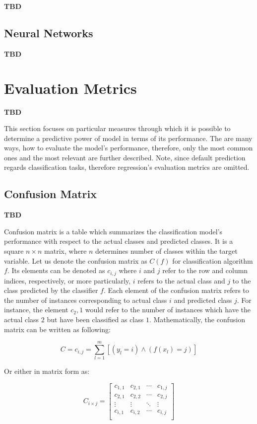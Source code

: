 \textbf{TBD}
\subsection{Neural Networks}

\textbf{TBD}

\section{Evaluation Metrics}

\textbf{TBD}

This section focuses on particular measures through which it is possible to determine a predictive power of model in terms of its performance.
The are many ways, how to evaluate the model's performance, therefore, only the most common ones and the most relevant are further described.
Note, since default prediction regards classification tasks, therefore regression's evaluation metrics are omitted.

\subsection{Confusion Matrix}

\textbf{TBD}

Confusion matrix is a table which summarizes the classification model's performance with respect to the actual classes and predicted classes.
It is a square $n \times n$ matrix, where $n$ determines number of classes within the target variable.
Let us denote the confusion matrix as $C\left(f\right)$ for classification algorithm $f$. 
Its elements can be denoted as $c_{i,j}$ where $i$ and $j$ refer to the row and column indices, respectively, or more particularly, $i$ refers to the actual class and $j$ to the class predicted by the classifier $f$.
Each element of the confusion matrix refers to the number of instances corresponding to actual class $i$ and predicted class $j$. For instance, the element $c_2,1$ would refer to the number of instances which have the actual class $2$ but have been classified as class $1$.
Mathematically, the confusion matrix can be written as following:

\begin{equation}\label{eq}
C = {c_{i,j} = \sum_{l=1}^{m}[(y_l=i) \land (f(x_l)=j)]}
\end{equation}

Or either in matrix form as:

\begin{equation}\label{eq}
    C_{i \times j} = \begin{bmatrix}
    c_{1,1} & c_{2,1} & \cdots & c_{1,j} \\
    c_{2,1} & c_{2,2} & \cdots & c_{2,j} \\
    \vdots & \vdots & \ddots & \vdots \\
    c_{i,1} & c_{i,2} & \cdots & c_{i,j} \\
    \end{bmatrix}
\end{equation}

